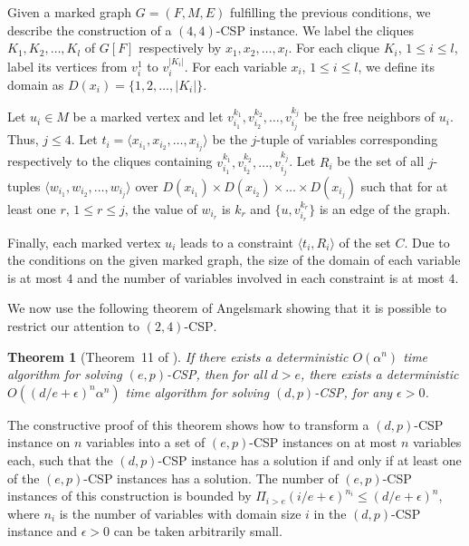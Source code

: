 \documentclass[a4paper,10pt]{article}
\theoremstyle{plain}
\newtheorem{theorem}{Theorem}
\theoremstyle{definition}
\theoremstyle{remark}
\newcommand{\CSPpb}{\textsc{CSP}\xspace}
\begin{document}
Given a marked graph $G=(F,M,E)$ fulfilling the previous conditions,
we describe the construction of a $(4,4)$-\CSPpb instance.
We label the cliques $K_1, K_2, \dots, K_l$ of $G[F]$ respectively by $x_1, x_2, \dots, x_l$.
For each clique $K_i$, $1\leq i \leq l$, label its vertices from $v_i^1$ to $v_i^{|K_i|}$.
For each variable $x_i$, $1 \leq i \leq l$, we define its domain as $D(x_i)=\{1,2, \dots, |K_i|\}$.

Let $u_i \in M$ be a marked vertex and let $v_{i_1}^{k_1}, v_{i_2}^{k_2}, \dots, v_{i_j}^{k_j}$
be the free neighbors of $u_i$. Thus, $j\leq 4$.
Let $t_i=\langle x_{i_1}, x_{i_2}, \dots, x_{i_j}\rangle$ be the $j$-tuple of variables corresponding respectively
to the cliques containing $v_{i_1}^{k_1}, v_{i_2}^{k_2}, \dots, v_{i_j}^{k_j}$.
Let $R_i$ be the set of all $j$-tuples $\langle w_{i_1}, w_{i_2}, \dots, w_{i_j}\rangle$
over $D(x_{i_1}) \times D(x_{i_2}) \times \dots \times D(x_{i_j})$
such that for at least one $r$, $1\leq r \leq j$, the value of $w_{i_r}$ is $k_r$
and $\{u,v_{i_r}^{k_r}\}$ is an edge of the graph.

Finally, each marked vertex $u_i$ leads to a constraint $\langle t_i,R_i\rangle$
of the set $C$. Due to the conditions on the given marked graph,
the size of the domain of each variable is at most $4$
and the number of variables involved in each constraint is at most $4$.





We now use the following theorem of Angelsmark \cite{Angelsmark05}
showing that it is possible to restrict our attention to
$(2,4)$-\CSPpb.

\begin{theorem}[Theorem~11 of \cite{Angelsmark05}]
If there exists a deterministic $O(\alpha^n)$ time algorithm for
solving $(e,p)$-\CSPpb, then for all $d>e$, there exists a deterministic
$O((d/e + \epsilon)^n \alpha^n)$ time algorithm for solving
$(d,p)$-\CSPpb, for any $\epsilon >0$.
\end{theorem}

The constructive proof of this theorem
shows how to transform a $(d,p)$-\CSPpb instance on $n$ variables into a set of
$(e,p)$-\CSPpb instances on at most $n$ variables each, such that the $(d,p)$-\CSPpb instance has a solution
if and only if at least one of the $(e,p)$-\CSPpb instances has a solution. The number
of $(e,p)$-\CSPpb instances of this construction is bounded by $\Pi_{i>e} (i/e + \epsilon)^{n_i} \le (d/e+\epsilon)^{n}$,
where $n_i$ is the number of variables with domain size $i$ in the $(d,p)$-\CSPpb instance and $\epsilon >0$ can
be taken arbitrarily small.
\end{document}
